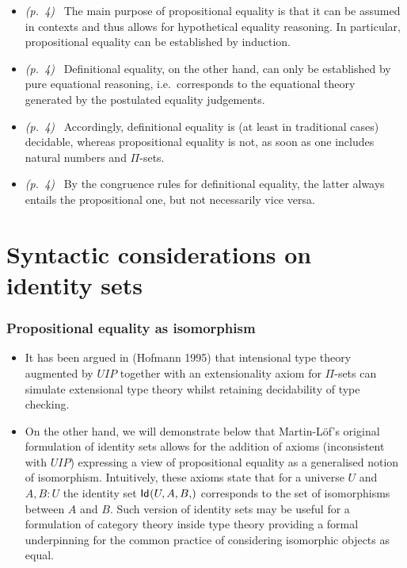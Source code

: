 \documentclass[handout,xcolor=dvipsnames]{beamer}
\newcommand\quotepage[1]{\emph{(p.~#1)}~}
\begin{document}
\begin{frame}
\begin{itemize}
\item<1-> \quotepage{4} The main purpose of propositional equality is that it can be 
  assumed in contexts and thus allows for hypothetical equality reasoning. In 
  particular, propositional equality can be established by induction.
\item<2-> \quotepage{4} Definitional equality, on the other hand, can only be 
  established by pure equational reasoning, i.e.~corresponds to the equational
  theory generated by the postulated equality judgements.
\item<3-> \quotepage{4} Accordingly, definitional equality is (at least in traditional
  cases) decidable, whereas propositional equality is not, as soon as one 
  includes natural numbers and $\Pi$-sets.
\item<4-> \quotepage{4} By the congruence rules for definitional equality, the latter
  always entails the propositional one, but not necessarily vice versa.
\end{itemize}
\end{frame}

\section{Syntactic considerations on identity sets}

\begin{frame}
  \frametitle{Propositional equality as isomorphism}
\begin{itemize}
\item<1-> It has been argued in (Hofmann 1995) that intensional type theory
augmented by $UIP$ together with an extensionality axiom for $\Pi$-sets
can simulate extensional type theory whilst retaining decidability of type
checking.
\item<2-> On the other hand, we will demonstrate below that Martin-L\"of's
original formulation of identity sets allows for the addition of axioms
(inconsistent with $UIP$) expressing a view of propositional equality as a
generalised notion of isomorphism. Intuitively, these axioms state that for a
universe $U$ and $A,B:U$ the identity set $\idtype{U,A,B}$ corresponds to the
set of isomorphisms between $A$ and $B$. Such version of identity sets may be
useful for a formulation of category theory inside type theory providing a
formal underpinning for the common practice of considering isomorphic objects
as equal.
\end{itemize}
\end{frame}
\end{document}
